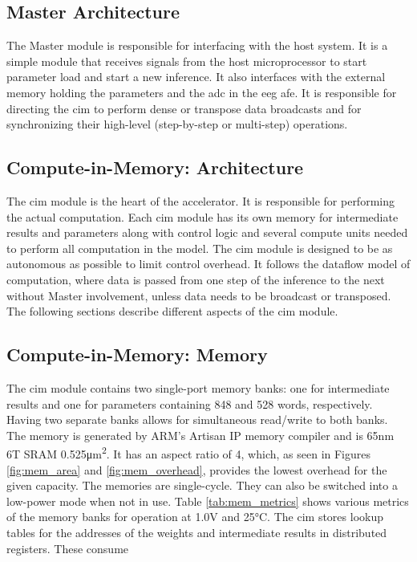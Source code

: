 \subsection{Master Architecture}
The Master module is responsible for interfacing with the host system. It is a simple module that receives signals from the host microprocessor to start parameter load and
start a new inference. It also interfaces with the external memory holding the parameters and the \ac{adc} in the \ac{eeg} \ac{afe}. It is responsible for directing the \ac{cim}
to perform dense or transpose data broadcasts and for synchronizing their high-level (step-by-step or multi-step) operations.

\subsection{Compute-in-Memory: Architecture}
The \ac{cim} module is the heart of the accelerator. It is responsible for performing the actual computation. Each \ac{cim} module has its own memory for intermediate results and
parameters along with control logic and several compute units needed to perform all computation in the model. The \ac{cim} module is designed to be as autonomous as possible to limit
control overhead. It follows the dataflow model of computation, where data is passed from one step of the inference to the next without Master involvement, unless data needs to be
broadcast or transposed. The following sections describe different aspects of the \ac{cim} module.

\subsection{Compute-in-Memory: Memory}
The \ac{cim} module contains two single-port memory banks: one for intermediate results and one for parameters containing 848 and 528 words, respectively. Having two separate banks
allows for simultaneous read/write to both banks. The memory is generated by ARM's Artisan IP memory compiler and is 65nm 6T SRAM 0.525\si{\square\micro\meter}. It has an aspect ratio of
4, which, as seen in Figures \ref{fig:mem_area} and \ref{fig:mem_overhead}, provides the lowest overhead for the given capacity. The memories are single-cycle. They can also be switched
into a low-power mode when not in use. Table \ref{tab:mem_metrics} shows various metrics of the memory banks for operation at 1.0V and 25\si{\degreeCelsius}.  The \ac{cim} stores lookup
tables for the addresses of the weights and intermediate results in distributed registers. These consume 

